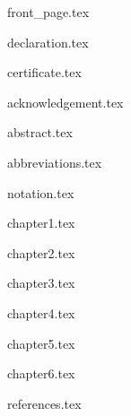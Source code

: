 \documentclass[12pt]{report}
\begin{document}
{front_page.tex}

{declaration.tex}

{certificate.tex}


{acknowledgement.tex}

{abstract.tex}

\tableofcontents
\newpage

\listoffigures

\listoftables
\newpage

{abbreviations.tex}

{notation.tex}

\sectionfont{\scshape}

\clearpage

\fancyhf{}
\setlength\headheight{15pt}
\fancyhead[L]{}
\fancyhead[R]{\chaptermark}
\cfoot{\thepage}


{chapter1.tex}

{chapter2.tex}

{chapter3.tex}

{chapter4.tex}

{chapter5.tex}

{chapter6.tex}

{references.tex}
\end{document}
